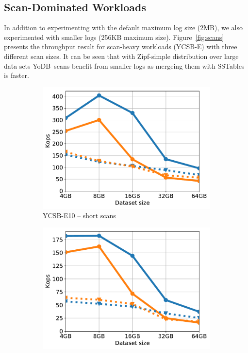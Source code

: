 \documentclass[letterpaper,twocolumn,10pt]{article}
\newcommand{\code}[1]{\textsf{\fontsize{9}{11}\selectfont #1}}
\newcommand{\sys}{YoDB}
\begin{document}
\subsection{Scan-Dominated Workloads}
In addition to experimenting with the default maximum \code{log} size (2MB), we also experimented with smaller \code{log}s (256KB maximum size).
Figure~\ref{fig:scans} presents the throughput result for scan-heavy workloads (YCSB-E) with three different scan 
sizes. It can be seen that with Zipf-simple distribution over large data sets \sys\ scans benefit from smaller \code{log}s as mergeing them with SSTables is faster.

\begin{figure}[tb]
\centering
\begin{subfigure}{0.33\linewidth}
\includegraphics[width=\textwidth]{figs/complementary/Workload_E-_line.pdf}
\caption{YCSB-E10 -- short scans}
\label{fig:throughput:e10}
\end{subfigure}
\begin{subfigure}{0.33\linewidth}
\includegraphics[width=\textwidth]{figs/complementary/Workload_E_line.pdf}

\end{subfigure}
\end{figure}
\end{document}
